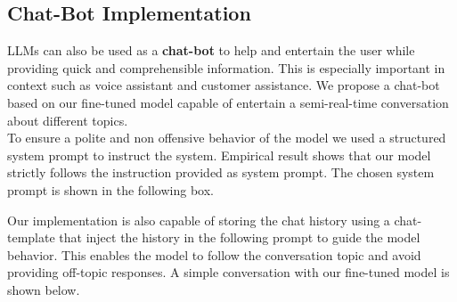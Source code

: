\documentclass{article}
\begin{document}
	\subsection{Chat-Bot Implementation}
	LLMs can also be used as a \textbf{chat-bot} to help and entertain the user while providing quick and comprehensible information. This is especially important in context such as voice assistant and customer assistance. We propose a chat-bot based on our fine-tuned model capable of entertain a semi-real-time conversation about different topics. \\
	To ensure a polite and non offensive behavior of the model we used a structured system prompt to instruct the system. Empirical result shows that our model strictly follows the instruction provided as system prompt. The chosen system prompt is shown in the following box.\\
	
	\begin{center}
	\end{center}
	
	Our implementation is also capable of storing the chat history using a chat-template that inject the history in the following prompt to guide the model behavior. This enables the model to follow the conversation topic and avoid providing off-topic responses. A simple conversation with our fine-tuned model is shown below.\\
	
\end{document}
